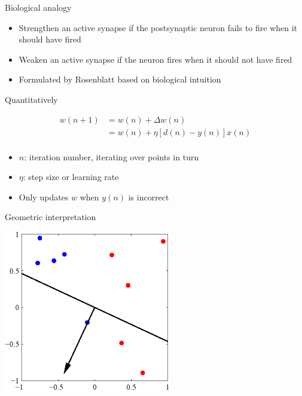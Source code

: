 \documentclass[notes]{beamer}
\providecommand{\tightlist}{%
  \setlength{\itemsep}{0pt}\setlength{\parskip}{0pt}}
\begin{document}
\begin{frame}{Biological analogy}

\begin{itemize}
\tightlist
\item
  Strengthen an active synapse if the postsynaptic neuron fails to fire
  when it should have fired
\item
  Weaken an active synapse if the neuron fires when it should not have
  fired
\item
  Formulated by Rosenblatt based on biological intuition
\end{itemize}

\end{frame}

\begin{frame}{Quantitatively}

\begin{equation} 
\begin{aligned} 
w(n+1) & = w(n) + \Delta w(n) \\ 
 & = w(n) + \eta [d(n)-y(n)]x(n) \\
\end{aligned}
\end{equation}

\begin{itemize}
\tightlist
\item
  \(n\): iteration number, iterating over points in turn
\item
  \(\eta\): step size or learning rate
\item
  Only updates \(w\) when \(y(n)\) is incorrect
\end{itemize}

\end{frame}

\begin{frame}{Geometric interpretation}

\centering 

\includegraphics[width=0.55000\textwidth]{2018-03-08-22-45-16.png}\\

\end{frame}
\end{document}
